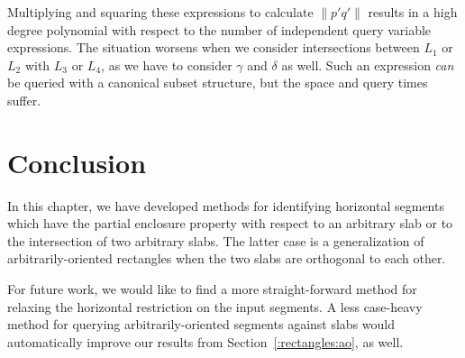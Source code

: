 Multiplying and squaring these expressions to calculate $\|p'q'\|$ results in a high degree polynomial with respect to the number of independent query variable expressions.
The situation worsens when we consider intersections between $L_1$ or $L_2$ with $L_3$ or $L_4$, as we have to consider $\gamma$ and $\delta$ as well.
Such an expression \emph{can} be queried with a canonical subset structure, but the space and query times suffer.

\section{Conclusion}
\label{:slabs:concl}

In this chapter, we have developed methods for identifying horizontal segments which have the partial enclosure property with respect to an arbitrary slab or to the intersection of two arbitrary slabs.
The latter case is a generalization of arbitrarily-oriented rectangles when the two slabs are orthogonal to each other.

For future work, we would like to find a more straight-forward method for relaxing the horizontal restriction on the input segments.  
A less case-heavy method for querying arbitrarily-oriented segments against slabs would automatically improve our results from Section~\ref{:rectangles:ao}, as well.
